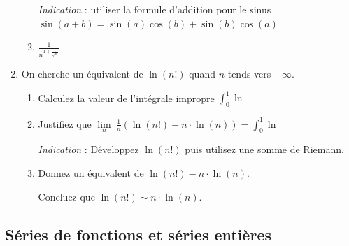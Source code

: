 \documentclass[]{article}
\begin{document}
\begin{enumerate}
\begin{enumerate}
	\textit{Indication} : utiliser la formule d'addition pour le sinus $\sin(a+b)=\sin(a)\cos(b)+\sin(b)\cos(a)$
	
	\item $\frac{1}{n^{1+\frac{1}{\sqrt{n}}}}$
\end{enumerate}

\item On cherche un équivalent de $\ln(n!)$ quand $n$ tends vers $+\infty$.
\begin{enumerate}
	\item Calculez la valeur de l'intégrale impropre $\displaystyle \int_0^1 \ln$
	
	\item Justifiez que $\displaystyle \lim\limits_{n} ~ \frac{1}{n}(\ln(n!) - n \cdot \ln(n)) = \int_{0}^{1} \ln$
	
	\textit{Indication} : Développez $\ln(n!)$ puis utilisez une somme de Riemann.
	
	\item Donnez un équivalent de $\ln(n!)-n \cdot \ln(n)$.
	
	Concluez que $\ln(n!) \sim n \cdot \ln(n)$.
\end{enumerate}

\end{enumerate}

\subsection{Séries de fonctions et séries entières}
\end{document}
